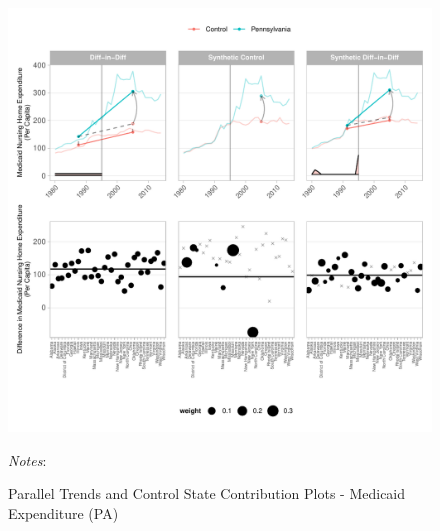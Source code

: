 \documentclass[12pt]{article}
\begin{document}
\newpage
\begin{figure}[t]
	\begin{center}
	\caption{\centering Parallel Trends and Control State Contribution Plots - Medicaid Expenditure (PA)}
    \includegraphics[width=\textwidth,keepaspectratio]{medicaid_expenditure_plots_PA.pdf}
    \end{center}
    \footnotesize
		\textit{Notes}:
\end{figure}
\clearpage
\end{document}
